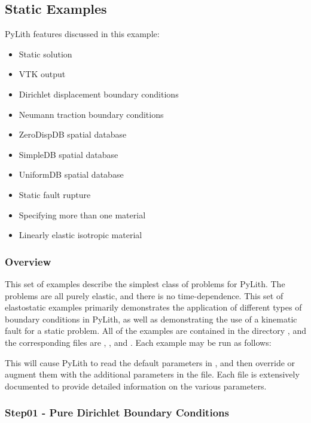 \subsection{Static Examples}
\label{sec:example:3dhex8-static}

PyLith features discussed in this example:
\begin{itemize}
\item Static solution
\item VTK output
\item Dirichlet displacement boundary conditions
\item Neumann traction boundary conditions
\item ZeroDispDB spatial database
\item SimpleDB spatial database
\item UniformDB spatial database
\item Static fault rupture
\item Specifying more than one material
\item Linearly elastic isotropic material
\end{itemize}

\subsubsection{Overview}

This set of examples describe the simplest class of problems for PyLith.
The problems are all purely elastic, and there is no time-dependence.
This set of elastostatic examples primarily demonstrates the application
of different types of boundary conditions in PyLith, as well as demonstrating
the use of a kinematic fault for a static problem. All of the examples
are contained in the directory , and the
corresponding  files are , ,
and . Each example may be run as follows:
This will cause PyLith to read the default parameters in ,
and then override or augment them with the additional parameters in
the  file. Each  file is extensively
documented to provide detailed information on the various parameters.


\subsubsection{Step01 - Pure Dirichlet Boundary Conditions}

